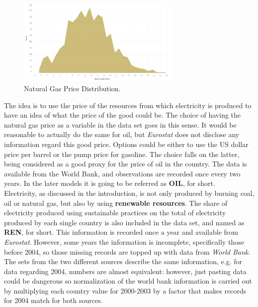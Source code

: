 \documentclass{book}
\begin{document}
\bigskip
\begin{figure}[H]
\begin{center}
\captionsetup{justification=centering}
\includegraphics[width=0.7\textwidth]{Images/nGas.png}
\caption{Natural Gas Price Distribution.}
\end{center}
\end{figure}
\bigskip

The idea is to use the price of the resources from which electricity is produced to have an idea of what the price of the good could be. The choice of having the natural gas price as a variable in the data set goes in this sense. It would be reasonable to actually do the same for oil, but \textit{Eurostat} does not disclose any information regard this good price. Options could be either to use the US dollar price per barrel or the pump price for gasoline. The choice falls on the latter, being considered as a good proxy for the price of oil in the country. The data is available from the World Bank, and observations are recorded once every two years. In the later models it is going to be referred as \textbf{OIL}, for short.\\

Electricity, as discussed in the introduction, is not only produced by burning coal, oil or natural gas, but also by using \textbf{renewable resources}. The share of electricity produced using sustainable practices on the total of electricity produced by each single country is also included in the data set, and named as \textbf{REN}, for short. This information is recorded once a year and available from \textit{Eurostat}. However, some years the information is incomplete, specifically those before 2004, so those missing records are topped up with data from \textit{World Bank}. The sets from the two different sources describe the same information, e.g. for data regarding 2004, numbers are almost equivalent: however, just pasting data could be dangerous so normalization of the world bank information is carried out by multiplying each country value for 2000-2003 by a factor that makes records for 2004 match for both sources. \\
\end{document}
